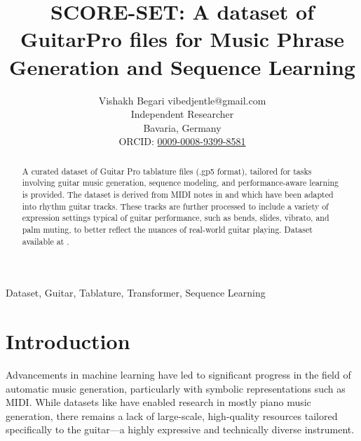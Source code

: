 \documentclass[twoside,11pt]{article}
\begin{document}
\title{SCORE-SET: A dataset of GuitarPro files for Music Phrase Generation and Sequence Learning}

\author{\name Vishakh Begari \email vibedjentle@gmail.com \\
       \addr Independent Researcher\\
       Bavaria, Germany\\
       ORCID: \href{https://orcid.org/0009-0008-9399-8581}{0009-0008-9399-8581}}


\maketitle

\begin{abstract}%
A curated dataset of Guitar Pro tablature files (.gp5 format), 
tailored for tasks involving guitar music generation, sequence modeling, and 
performance-aware learning is provided. 
The dataset is derived from MIDI notes in \cite{hawthorne2018enabling} and 
\cite{kong2022giantmidipianolargescalemididataset} which have been 
adapted into rhythm guitar tracks. These tracks are 
further processed to include a variety of expression settings typical 
of guitar performance, such as bends, slides, vibrato, and palm muting, 
to better reflect the nuances of real-world guitar playing. Dataset available at 
\cite{SCORESET}.
\end{abstract}

\begin{keywords}
  Dataset, Guitar, Tablature, Transformer, Sequence Learning
\end{keywords}

\section{Introduction}
Advancements in machine learning have led to significant progress in the 
field of automatic music generation, particularly with symbolic representations 
such as MIDI. While datasets like 
\cite{hawthorne2018enabling} 
\cite{7952261} 
\cite{thickstun2017learningfeaturesmusicscratch} 
\cite{bertinmahieux-2011-million} 
\cite{peracha2022jsfakechoralessynthetic}
\cite{bradshaw2025ariamididatasetpianomidi}
\cite{kong2022giantmidipianolargescalemididataset}
have enabled research in mostly piano music generation, there remains a lack of 
large-scale, high-quality resources tailored specifically to the guitar—a highly 
expressive and technically diverse instrument.
\end{document}
